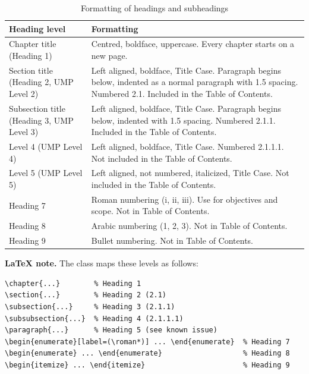 \begin{table}[htbp]
\caption{Formatting of headings and subheadings}
\label{tab:headings}
\begin{tabularx}{\textwidth}{@{} l X @{}}
\toprule
Heading level & Formatting \\
\midrule
Chapter title (Heading 1) & Centred, boldface, uppercase. Every chapter starts on a new page. \\
Section title (Heading 2, UMP Level 2) & Left aligned, boldface, Title Case. Paragraph begins below, indented as a normal paragraph with 1.5 spacing. Numbered 2.1. Included in the Table of Contents. \\
Subsection title (Heading 3, UMP Level 3) & Left aligned, boldface, Title Case. Paragraph begins below, indented with 1.5 spacing. Numbered 2.1.1. Included in the Table of Contents. \\
Level 4 (UMP Level 4) & Left aligned, boldface, Title Case. Numbered 2.1.1.1. Not included in the Table of Contents. \\
Level 5 (UMP Level 5) & Left aligned, not numbered, italicized, Title Case. Not included in the Table of Contents. \\
Heading 7 & Roman numbering (i, ii, iii). Use for objectives and scope. Not in Table of Contents. \\
Heading 8 & Arabic numbering (1, 2, 3). Not in Table of Contents. \\
Heading 9 & Bullet numbering. Not in Table of Contents. \\
\bottomrule
\end{tabularx}
\end{table}

\textbf{LaTeX note.} The class maps these levels as follows:
\begin{verbatim}
\chapter{...}        % Heading 1
\section{...}        % Heading 2 (2.1)
\subsection{...}     % Heading 3 (2.1.1)
\subsubsection{...}  % Heading 4 (2.1.1.1)
\paragraph{...}      % Heading 5 (see known issue)
\begin{enumerate}[label=(\roman*)] ... \end{enumerate}  % Heading 7
\begin{enumerate} ... \end{enumerate}                   % Heading 8
\begin{itemize} ... \end{itemize}                       % Heading 9
\end{verbatim}

